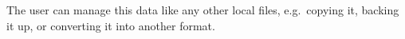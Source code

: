 The user can manage this data like any other local files, e.g.\ copying it, backing it up, or converting it into another format. %

